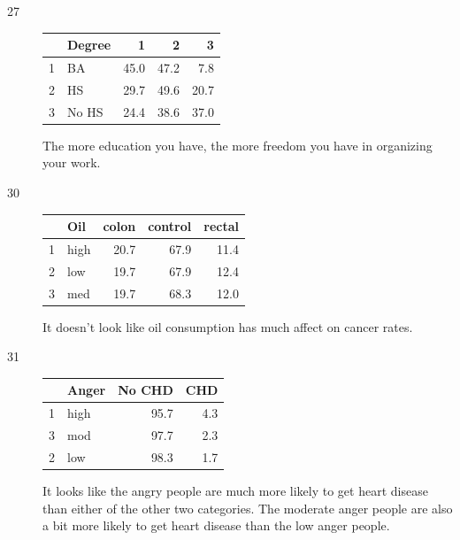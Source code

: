 \documentclass[letterpaper]{exam}
\begin{document}
\begin{description}
    \item[27]
      \begin{table}[H]
        \centering
        \begin{tabular}{rlrrr}
          \toprule
            & Degree & 1    & 2    & 3     \\
          \midrule
          1 & BA     & 45.0 & 47.2 & 7.8  \\
          2 & HS     & 29.7 & 49.6 & 20.7 \\
          3 & No HS  & 24.4 & 38.6 & 37.0 \\
          \bottomrule
        \end{tabular}
      \end{table}

      The more education you have, the more freedom you have in organizing your work.

    \item[30]
      \begin{table}[H]
        \centering
        \begin{tabular}{rlrrr}
          \toprule
            & Oil  & colon & control & rectal \\
          \midrule
          1 & high & 20.7  & 67.9    & 11.4 \\
          2 & low  & 19.7  & 67.9    & 12.4 \\
          3 & med  & 19.7  & 68.3    & 12.0 \\
          \bottomrule
        \end{tabular}
      \end{table}

      It doesn't look like oil consumption has much affect on cancer rates.

    \item[31]
      \begin{table}[H]
        \centering
        \begin{tabular}{rlrr}
          \toprule
            & Anger & No CHD & CHD \\
          \midrule
          1 & high  & 95.7   & 4.3 \\
          3 & mod   & 97.7   & 2.3 \\
          2 & low   & 98.3   & 1.7 \\
          \bottomrule
        \end{tabular}
      \end{table}

      It looks like the angry people are much more likely to get heart disease than
      either of the other two categories.  The moderate anger people are also a bit
      more likely to get heart disease than the low anger people.

  \end{description}
\end{document}
